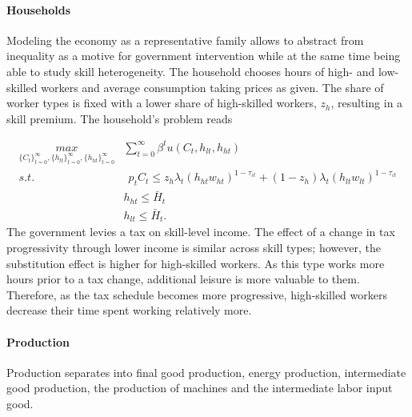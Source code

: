 \paragraph{Households}
Modeling the economy as a representative family allows to abstract from inequality as a motive for government intervention while at the same time being able to study skill heterogeneity.
 The household chooses hours of high- and low-skilled workers and average consumption taking prices as given. The share of worker types is fixed with a lower share of high-skilled workers, $z_h$, resulting in a skill premium. The household's problem reads

\begin{align}
\underset{\{C_{t}\}_{t=0}^{\infty}, \{h_{lt}\}_{t=0}^{\infty}, \{h_{ht}\}_{t=0}^{\infty}}{max}&
\sum_{t=0}^{\infty}\beta^t u(C_{t}, h_{lt}, h_{ht})\\
s.t.& \ \ p_{t}C_{t}\leq%
z_h\lambda_t \left(h_{ht}w_{ht}\right)^{1-\tau_{\iota t}}+(1-z_h)\lambda_t\left(h_{lt}w_{lt}\right)^{1-\tau_{\iota t}}\\ %
\ & h_{ht}\leq \bar{H}_t\\
\ & h_{lt}\leq \bar{H}_t.
\end{align}
The government levies a tax on skill-level income. 
The effect of a change in tax progressivity through lower income is similar across skill types; however, the substitution effect is higher for high-skilled workers. As this type works more hours prior to a tax change, additional leisure is more valuable to them. Therefore, as the tax schedule becomes more progressive, high-skilled workers decrease their time spent working relatively more.

\paragraph{Production}
Production separates into final good production, energy production, intermediate good production, the production of machines and the intermediate labor input good. 

